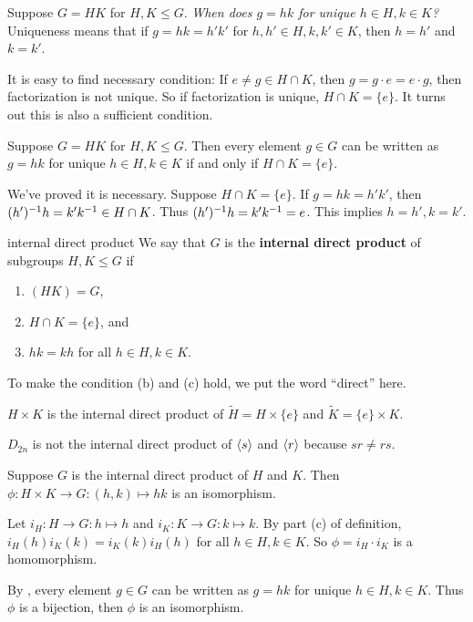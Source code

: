 Suppose $G=HK$ for $H,K\le G$. \textit{When does $g=hk$ for unique $h\in H,k\in K$?} Uniqueness means that if $g=hk=h'k'$ for $h,h'\in H,k,k'\in K$, then $h=h'$ and $k=k'$.

It is easy to find necessary condition: If $e\ne g\in H\cap K$, then $g=g\cdot e= e\cdot g$, then factorization is not unique. So if factorization is unique, $H\cap K=\{e\}$. It turns out this is also a sufficient condition.

\begin{lemma}
Suppose $G=HK$ for $H,K\le G$. Then every element $g\in G$ can be written as $g=hk$ for unique $h\in H,k\in K$ if and only if $H\cap K=\{e\}$.
\end{lemma}

\begin{pf}
We've proved it is necessary. Suppose $H\cap K=\{e\}$. If $g=hk=h'k'$, then $(h')^{-1} h = k'k^{-1}\in H\cap K$. Thus $(h')^{-1} h = k'k^{-1} =e$. This implies $h=h',k=k'$.
\end{pf}

\begin{defn}{internal direct product}
We say that $G$ is the \textbf{internal direct product} of subgroups $H,K\le G$ if 
\begin{enumerate}[label=(\alph*)]
\item $(HK)=G$,
\item $H\cap K=\{e\}$, and 
\item $hk=kh$ for all $h\in H,k\in K$.
\end{enumerate}
\end{defn}

\begin{remark}
To make the condition (b) and (c) hold, we put the word ``direct'' here.
\end{remark}

\begin{ex}
$H\times K$ is the internal direct product of $\tilde{H}=H\times \{e\}$ and $\tilde{K}=\{e\}\times K$.

$D_{2n}$ is not the internal direct product of $\left\langle s \right\rangle$ and $\left\langle r \right\rangle$ because $sr\ne rs$.
\end{ex}

\begin{thm}
Suppose $G$ is the internal direct product of $H$ and $K$. Then $\phi:H\times K\to G: (h,k)\mapsto hk$ is an isomorphism.
\end{thm}

\begin{pf}
Let $i_H:H\to G:h\mapsto h$ and $i_K:K\to G:k\mapsto k$. By part (c) of definition, $i_H(h)i_K(k) = i_K(k)i_H(h)$ for all $h\in H,k\in K$. So $\phi = i_H\cdot i_K$ is a homomorphism.

By , every element $g\in G$ can be written as $g=hk$ for unique $h\in H,k\in K$. Thus $\phi$ is a bijection, then $\phi$ is an isomorphism.
\end{pf}

